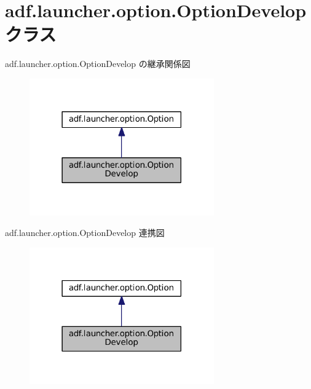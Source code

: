\hypertarget{classadf_1_1launcher_1_1option_1_1OptionDevelop}{}\section{adf.\+launcher.\+option.\+Option\+Develop クラス}
\label{classadf_1_1launcher_1_1option_1_1OptionDevelop}


adf.\+launcher.\+option.\+Option\+Develop の継承関係図
\nopagebreak
\begin{figure}[H]
\begin{center}
\leavevmode
\includegraphics[width=225pt]{classadf_1_1launcher_1_1option_1_1OptionDevelop__inherit__graph}
\end{center}
\end{figure}


adf.\+launcher.\+option.\+Option\+Develop 連携図
\nopagebreak
\begin{figure}[H]
\begin{center}
\leavevmode
\includegraphics[width=225pt]{classadf_1_1launcher_1_1option_1_1OptionDevelop__coll__graph}
\end{center}
\end{figure}
